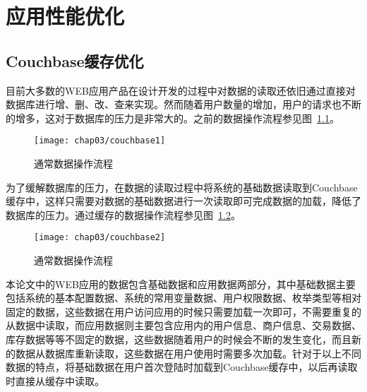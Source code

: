 \chapter{应用性能优化}
\label{cha:ApplicationOptimization}
\section{Couchbase缓存优化}
目前大多数的WEB应用产品在设计开发的过程中对数据的读取还依旧通过直接对数据库进行增、删、改、查来实现。然而随着用户数量的增加，用户的请求也不断的增多，这对于数据库的压力是非常大的。之前的数据操作流程参见图~\ref{fig:couchbase1}。
\begin{figure}[H] %
  \centering
  \texttt{[image: chap03/couchbase1]}
  \caption{通常数据操作流程}
  \label{fig:couchbase1}
\end{figure}
为了缓解数据库的压力，在数据的读取过程中将系统的基础数据读取到Couchbase缓存中，这样只需要对数据的基础数据进行一次读取即可完成数据的加载，降低了数据库的压力。通过缓存的数据操作流程参见图~\ref{fig:couchbase2}。
\begin{figure}[H] %
  \centering
  \texttt{[image: chap03/couchbase2]}
  \caption{通常数据操作流程}
  \label{fig:couchbase2}
\end{figure}
本论文中的WEB应用的数据包含基础数据和应用数据两部分，其中基础数据主要包括系统的基本配置数据、系统的常用变量数据、用户权限数据、枚举类型等相对固定的数据，这些数据在用户访问应用的时候只需要加载一次即可，不需要重复的从数据中读取，而应用数据则主要包含应用内的用户信息、商户信息、交易数据、库存数据等等不固定的数据，这些数据随着用户的时候会不断的发生变化，而且新的数据从数据库重新读取，这些数据在用户使用时需要多次加载。针对于以上不同数据的特点，将基础数据在用户首次登陆时加载到Couchbase缓存中，以后再读取时直接从缓存中读取。
